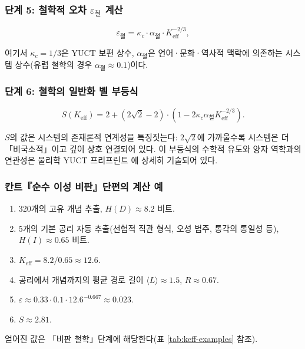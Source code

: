 \documentclass[11pt,a4paper]{article}
\newcommand{\kappac}{\kappa_c}
\newcommand{\eps}{\varepsilon}
\begin{document}
	\subsubsection{단계 5: 철학적 오차 \(\eps_{\text{철}}\) 계산}
	
	\[
	\eps_{\text{철}} = \kappac \cdot \alpha_{\text{철}} \cdot K_{\mathrm{eff}}^{-2/3},
	\]
	
	여기서 \(\kappac = 1/3\)은 YUCT 보편 상수, \(\alpha_{\text{철}}\)은 언어·문화·역사적 맥락에 의존하는 시스템 상수(유럽 철학의 경우 \(\alpha_{\text{철}} \approx 0.1\))이다.
	
	\subsubsection{단계 6: 철학의 일반화 벨 부등식}
	
	\[
	S(K_{\mathrm{eff}}) = 2 + (2\sqrt{2} - 2) \cdot \left(1 - 2\kappac \alpha_{\text{철}} K_{\mathrm{eff}}^{-2/3}\right).
	\]
	
	\(S\)의 값은 시스템의 존재론적 연계성을 특징짓는다: \(2\sqrt{2}\)에 가까울수록 시스템은 더 「비국소적」이고 깊이 상호 연결되어 있다. 이 부등식의 수학적 유도와 양자 역학과의 연관성은 물리학 YUCT 프리프린트 \cite{Yakushev2026b}에 상세히 기술되어 있다.
	
	\subsubsection{칸트『순수 이성 비판』단편의 계산 예}
	
	\begin{enumerate}
		\item 320개의 고유 개념 추출, \(H(D) \approx 8.2\) 비트.
		\item 5개의 기본 공리 자동 추출(선험적 직관 형식, 오성 범주, 통각의 통일성 등), \(H(I) \approx 0.65\) 비트.
		\item \(K_{\mathrm{eff}} = 8.2 / 0.65 \approx 12.6\).
		\item 공리에서 개념까지의 평균 경로 길이 \(\langle L \rangle \approx 1.5\), \(R \approx 0.67\).
		\item \(\eps \approx 0.33 \cdot 0.1 \cdot 12.6^{-0.667} \approx 0.023\).
		\item \(S \approx 2.81\).
	\end{enumerate}
	
	얻어진 값은 「비판 철학」단계에 해당한다(표 \ref{tab:keff-examples} 참조).
	
	
\end{document}
